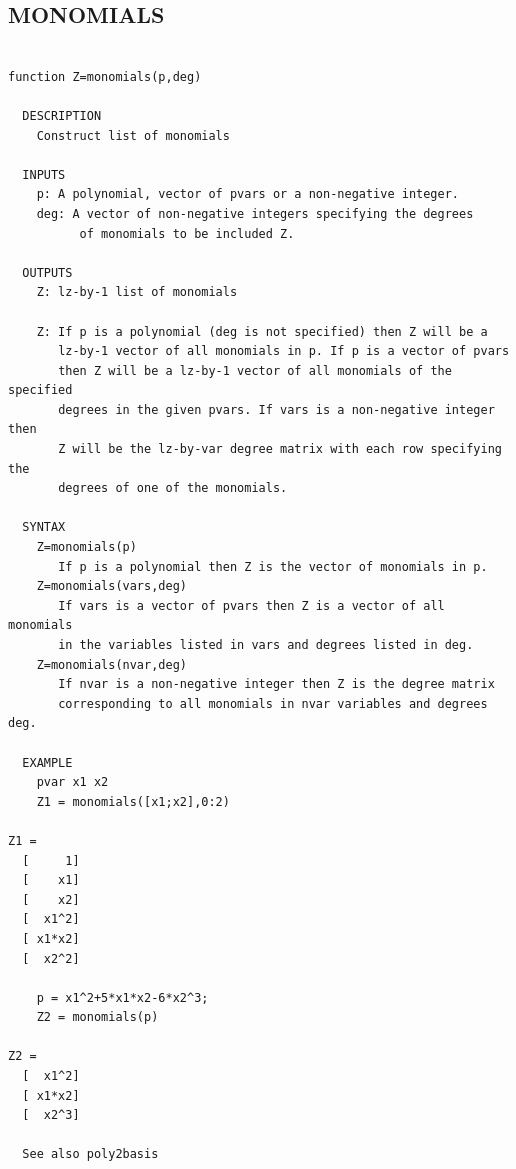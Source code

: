 \documentclass{article}
\begin{document}
\subsection{MONOMIALS}
\begin{verbatim}

function Z=monomials(p,deg)

  DESCRIPTION
    Construct list of monomials

  INPUTS
    p: A polynomial, vector of pvars or a non-negative integer.
    deg: A vector of non-negative integers specifying the degrees
          of monomials to be included Z.

  OUTPUTS
    Z: lz-by-1 list of monomials

    Z: If p is a polynomial (deg is not specified) then Z will be a
       lz-by-1 vector of all monomials in p. If p is a vector of pvars
       then Z will be a lz-by-1 vector of all monomials of the specified
       degrees in the given pvars. If vars is a non-negative integer then
       Z will be the lz-by-var degree matrix with each row specifying the
       degrees of one of the monomials.

  SYNTAX
    Z=monomials(p)
       If p is a polynomial then Z is the vector of monomials in p.
    Z=monomials(vars,deg)
       If vars is a vector of pvars then Z is a vector of all monomials
       in the variables listed in vars and degrees listed in deg.
    Z=monomials(nvar,deg)
       If nvar is a non-negative integer then Z is the degree matrix
       corresponding to all monomials in nvar variables and degrees deg.

  EXAMPLE
    pvar x1 x2
    Z1 = monomials([x1;x2],0:2)

Z1 =
  [     1]
  [    x1]
  [    x2]
  [  x1^2]
  [ x1*x2]
  [  x2^2]

    p = x1^2+5*x1*x2-6*x2^3;
    Z2 = monomials(p)

Z2 =
  [  x1^2]
  [ x1*x2]
  [  x2^3]

  See also poly2basis


\end{verbatim}

\newpage
\end{document}
